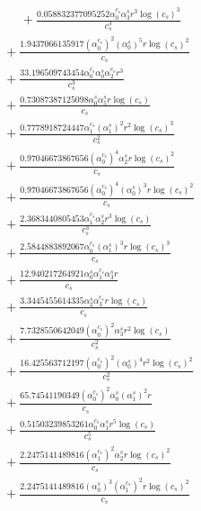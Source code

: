 \documentclass[10pt]{article}
\begin{document}
\begin{align*}
\phantom{R_{3,8}} &\phantom{={}}{}  + \frac{0.058832377095252 \alpha_{0}^{c_s} \alpha_{3}^s r^{3} \log{\left(c_{s} \right)}^{3}}{c_{s}^{3}} \\
&{}  + \frac{1.9437066135917 \left(\alpha_{0}^{c_s}\right)^{2} \left(\alpha_{0}^s\right)^{5} r \log{\left(c_{s} \right)}^{2}}{c_{s}} \\
&{}  + \frac{33.196509743454 \alpha_{0}^{c_s} \alpha_{0}^s \alpha_{2}^{c_s} r^{3}}{c_{s}^{3}} \\
&{}  + \frac{0.73087387125098 \alpha_{0}^s \alpha_{5}^s r \log{\left(c_{s} \right)}}{c_{s}} \\
&{}  + \frac{0.7778918724447 \alpha_{1}^{c_s} \left(\alpha_{1}^s\right)^{2} r^{2} \log{\left(c_{s} \right)}^{3}}{c_{s}^{2}} \\
&{}  + \frac{0.97046673867656 \left(\alpha_{0}^{c_s}\right)^{4} \alpha_{2}^s r \log{\left(c_{s} \right)}^{2}}{c_{s}} \\
&{}  + \frac{0.97046673867656 \left(\alpha_{0}^{c_s}\right)^{4} \left(\alpha_{0}^s\right)^{3} r \log{\left(c_{s} \right)}^{2}}{c_{s}} \\
&{}  + \frac{2.3683440805453 \alpha_{1}^{c_s} \alpha_{2}^s r^{3} \log{\left(c_{s} \right)}}{c_{s}^{3}} \\
&{}  + \frac{2.5844883892067 \alpha_{0}^{c_s} \left(\alpha_{1}^s\right)^{3} r \log{\left(c_{s} \right)}^{3}}{c_{s}} \\
&{}  + \frac{12.940217264921 \alpha_{0}^s \alpha_{1}^{c_s} \alpha_{3}^s r}{c_{s}} \\
&{}  + \frac{3.3445455614335 \alpha_{2}^s \alpha_{3}^{c_s} r \log{\left(c_{s} \right)}}{c_{s}} \\
&{}  + \frac{7.7328550642049 \left(\alpha_{0}^{c_s}\right)^{2} \alpha_{3}^s r^{2} \log{\left(c_{s} \right)}}{c_{s}^{2}} \\
&{}  + \frac{16.425563712197 \left(\alpha_{0}^{c_s}\right)^{2} \left(\alpha_{0}^s\right)^{4} r^{2} \log{\left(c_{s} \right)}^{2}}{c_{s}^{2}} \\
&{}  + \frac{65.74541190349 \left(\alpha_{0}^{c_s}\right)^{2} \alpha_{0}^s \left(\alpha_{1}^s\right)^{2} r}{c_{s}} \\
&{}  + \frac{0.51503239853261 \alpha_{0}^{c_s} \alpha_{1}^s r^{5} \log{\left(c_{s} \right)}}{c_{s}^{5}} \\
&{}  + \frac{2.2475141489816 \left(\alpha_{1}^{c_s}\right)^{2} \alpha_{2}^s r \log{\left(c_{s} \right)}^{2}}{c_{s}} \\
&{}  + \frac{2.2475141489816 \left(\alpha_{0}^s\right)^{3} \left(\alpha_{1}^{c_s}\right)^{2} r \log{\left(c_{s} \right)}^{2}}{c_{s}} \\

\end{align*}
\end{document}
